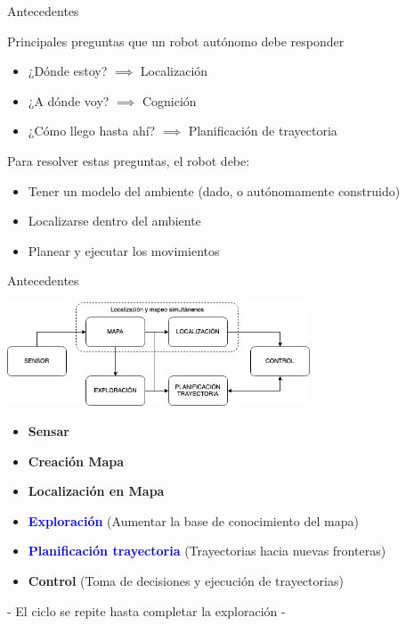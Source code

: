 \documentclass[24pt,aspectratio=169]{beamer}
\begin{document}
\begin{frame}[fragile]{Antecedentes}
  
  Principales preguntas que un robot autónomo debe responder \footnotemark\\
  \begin{itemize}
  \item ¿Dónde estoy? $\implies$ Localización 
  \item ¿A dónde voy? $\implies$ Cognición
  \item ¿Cómo llego hasta ahí? $\implies$ Planificación de trayectoria
  \end{itemize}
  \pause
  Para resolver estas preguntas, el robot debe:\\
  \begin{itemize}
  \item Tener un modelo del ambiente (dado, o autónomamente construido)
  \item Localizarse dentro del ambiente
  \item Planear y ejecutar los movimientos
  \end{itemize}

  
\end{frame}

\begin{frame}{Antecedentes}
  
  \centering
  \bigskip %
  \includegraphics[width=9cm]{exploracion}\\
  
  \begin{itemize}
  \item \textbf{Sensar}
  \item \textbf{Creación Mapa} 
  \item \textbf{Localización en Mapa}
  \item \textbf{\textcolor{blue}{Exploración}} (Aumentar la base de conocimiento del mapa)
  \item \textbf{\textcolor{blue}{Planificación trayectoria}} (Trayectorias hacia nuevas fronteras) 
  \item \textbf{Control} (Toma de decisiones y ejecución de trayectorias)
  \end{itemize}
  
  \alert{- El ciclo se repite hasta completar la exploración -}

\end{frame}
\end{document}
